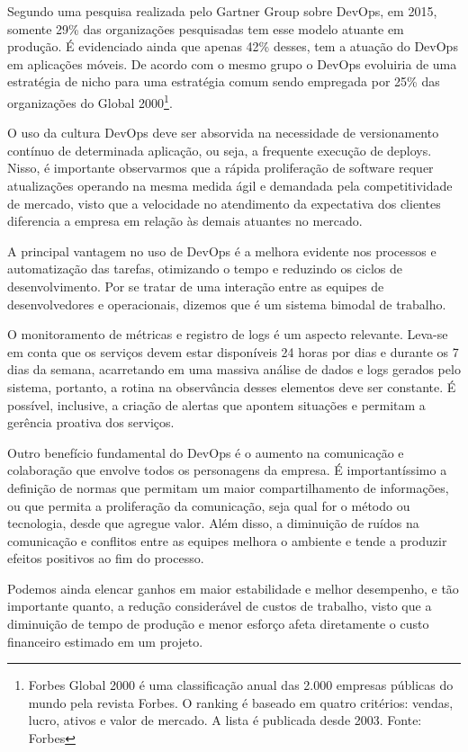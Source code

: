 Segundo uma pesquisa realizada pelo Gartner Group sobre DevOps, em 2015, somente 29\% das organizações pesquisadas tem esse modelo atuante em produção. É evidenciado ainda que apenas 42\% desses, tem a atuação do DevOps em aplicações móveis. De acordo com o mesmo grupo o DevOps evoluiria de uma estratégia de nicho para uma estratégia comum sendo empregada por 25\% das organizações do Global 2000\footnote{Forbes Global 2000 é uma classificação anual das 2.000 empresas públicas do mundo pela revista Forbes. O ranking é baseado em quatro critérios: vendas, lucro, ativos e valor de mercado. A lista é publicada desde 2003. Fonte: Forbes}.\cite{gartnerglobal}

O uso da cultura DevOps deve ser absorvida na necessidade de versionamento contínuo de determinada aplicação, ou seja, a frequente execução de deploys. Nisso, é importante observarmos que a rápida proliferação de software requer atualizações operando na mesma medida ágil e demandada pela competitividade de mercado, visto que a velocidade no atendimento da expectativa dos clientes diferencia a empresa em relação às demais atuantes no mercado.

A principal vantagem no uso de DevOps é a melhora evidente nos processos e automatização das tarefas, otimizando o tempo e reduzindo os ciclos de desenvolvimento. Por se tratar de uma interação entre as equipes de desenvolvedores e operacionais, dizemos que é um sistema bimodal de trabalho.\cite{sato2014devops}

O monitoramento de métricas e registro de logs é um aspecto relevante. Leva-se em conta que os serviços devem estar disponíveis 24 horas por dias e durante os 7 dias da semana, acarretando em uma massiva análise de dados e logs gerados pelo sistema, portanto, a rotina na observância desses elementos deve ser constante. É possível, inclusive, a criação de alertas que apontem situações e permitam a gerência proativa dos serviços.

Outro benefício fundamental do DevOps é o aumento na comunicação e colaboração que envolve todos os personagens da empresa. É importantíssimo a definição de normas que permitam um maior compartilhamento de informações, ou que permita a proliferação da comunicação, seja qual for o método ou tecnologia, desde que agregue valor. Além disso, a diminuição de ruídos na comunicação e conflitos entre as equipes melhora o ambiente e tende a produzir efeitos positivos ao fim do processo.\cite{gaea}

Podemos ainda elencar ganhos em maior estabilidade e melhor desempenho, e tão importante quanto, a redução considerável de custos de trabalho, visto que a diminuição de tempo de produção e menor esforço afeta diretamente o custo financeiro estimado em um projeto.


